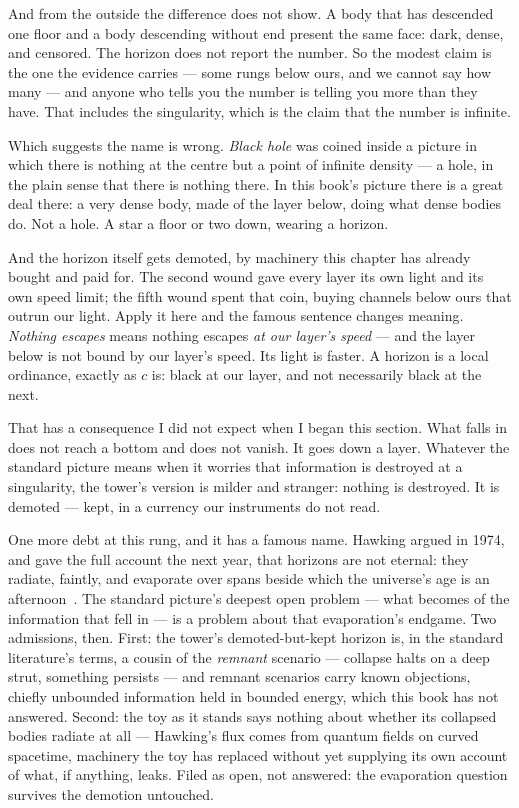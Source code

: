 \documentclass[fontsize=11pt,paper=a4,pagesize=auto,parskip=half-]{scrbook}
\begin{document}
And from the outside the difference does not show. A body that has descended one floor and a body descending without end present the same face: dark, dense, and censored. The horizon does not report the number. So the modest claim is the one the evidence carries --- some rungs below ours, and we cannot say how many --- and anyone who tells you the number is telling you more than they have. That includes the singularity, which is the claim that the number is infinite.

Which suggests the name is wrong. \emph{Black hole} was coined inside a picture in which there is nothing at the centre but a point of infinite density --- a hole, in the plain sense that there is nothing there. In this book's picture there is a great deal there: a very dense body, made of the layer below, doing what dense bodies do. Not a hole. A star a floor or two down, wearing a horizon.

And the horizon itself gets demoted, by machinery this chapter has already bought and paid for. The second wound gave every layer its own light and its own speed limit; the fifth wound spent that coin, buying channels below ours that outrun our light. Apply it here and the famous sentence changes meaning. \emph{Nothing escapes} means nothing escapes \emph{at our layer's speed} --- and the layer below is not bound by our layer's speed. Its light is faster. A horizon is a local ordinance, exactly as $c$ is: black at our layer, and not necessarily black at the next.

That has a consequence I did not expect when I began this section. What falls in does not reach a bottom and does not vanish. It goes down a layer. Whatever the standard picture means when it worries that information is destroyed at a singularity, the tower's version is milder and stranger: nothing is destroyed. It is demoted --- kept, in a currency our instruments do not read.

One more debt at this rung, and it has a famous name. Hawking argued in 1974, and gave the full account the next year, that horizons are not eternal: they radiate, faintly, and evaporate over spans beside which the universe's age is an afternoon~\cite{hawking1975}. The standard picture's deepest open problem --- what becomes of the information that fell in --- is a problem about that evaporation's endgame. Two admissions, then. First: the tower's demoted-but-kept horizon is, in the standard literature's terms, a cousin of the \emph{remnant} scenario --- collapse halts on a deep strut, something persists --- and remnant scenarios carry known objections, chiefly unbounded information held in bounded energy, which this book has not answered. Second: the toy as it stands says nothing about whether its collapsed bodies radiate at all --- Hawking's flux comes from quantum fields on curved spacetime, machinery the toy has replaced without yet supplying its own account of what, if anything, leaks. Filed as open, not answered: the evaporation question survives the demotion untouched.
\end{document}
